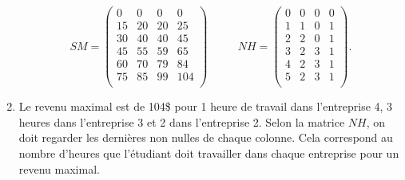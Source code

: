 \documentclass[11pt]{article}
\begin{document}
\begin{enumerate}[label=\Roman*.]
\bigskip

$$SM=\left( \begin{matrix}
0& 0& 0 & 0   \\
15& 20& 20 & 25   \\
30& 40& 40 & 45   \\
45& 55& 59 & 65   \\
60& 70& 79 & 84   \\
75& 85& 99 & 104   \\
\end{matrix}  \right) \,\,\,\,  \,\,\,\,  \,\,\,\,  \,\,\,\, NH=\left( \begin{matrix}
0& 0& 0 & 0   \\
1& 1& 0 & 1   \\
2& 2& 0 & 1   \\
3& 2& 3 & 1   \\
4& 2& 3 & 1   \\
5& 2& 3 & 1   \\
\end{matrix}  \right).  $$

\item Le revenu maximal est de 104\$ pour 1 heure de travail dans l'entreprise 4, 3 heures dans l'entreprise 3 et 2 dans l'entreprise 2.
Selon la matrice $NH$, on doit regarder les dernières non nulles de chaque colonne. Cela correspond au nombre d'heures que l'étudiant doit travailler dans chaque entreprise pour un revenu maximal.
\end{enumerate}
\end{document}

